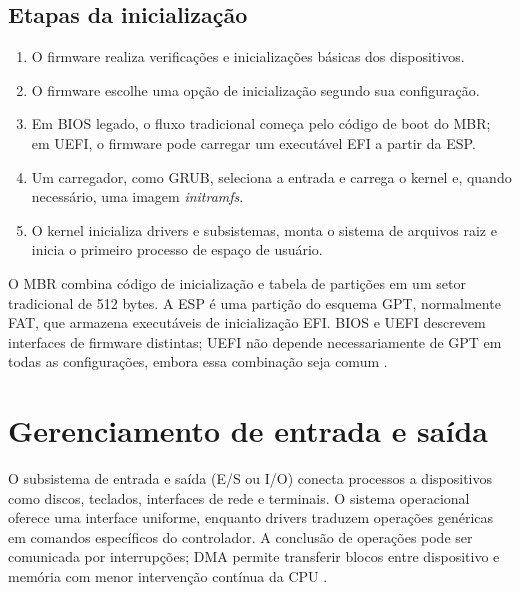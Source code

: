 \documentclass[12pt,a4paper,oneside]{article}
\begin{document}
\subsection{Etapas da inicialização}
\begin{enumerate}
\item O firmware realiza verificações e inicializações básicas dos dispositivos.
\item O firmware escolhe uma opção de inicialização segundo sua configuração.
\item Em BIOS legado, o fluxo tradicional começa pelo código de boot do MBR; em UEFI, o firmware pode carregar um executável EFI a partir da ESP.
\item Um carregador, como GRUB, seleciona a entrada e carrega o kernel e, quando necessário, uma imagem \textit{initramfs}.
\item O kernel inicializa drivers e subsistemas, monta o sistema de arquivos raiz e inicia o primeiro processo de espaço de usuário.
\end{enumerate}
O MBR combina código de inicialização e tabela de partições em um setor tradicional de 512 bytes. A ESP é uma partição do esquema GPT, normalmente FAT, que armazena executáveis de inicialização EFI. BIOS e UEFI descrevem interfaces de firmware distintas; UEFI não depende necessariamente de GPT em todas as configurações, embora essa combinação seja comum \cite{uefi,tanenbaum}.

\section{Gerenciamento de entrada e saída}
O subsistema de entrada e saída (E/S ou I/O) conecta processos a dispositivos como discos, teclados, interfaces de rede e terminais. O sistema operacional oferece uma interface uniforme, enquanto drivers traduzem operações genéricas em comandos específicos do controlador. A conclusão de operações pode ser comunicada por interrupções; DMA permite transferir blocos entre dispositivo e memória com menor intervenção contínua da CPU \cite{silberschatz,linuxblk}.
\end{document}
